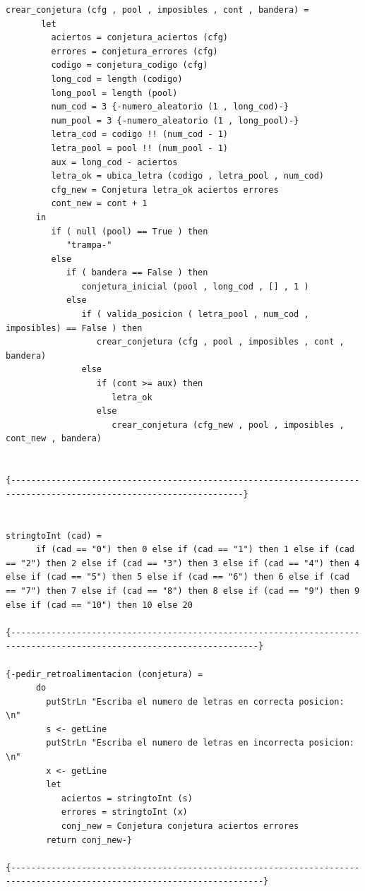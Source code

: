 \begin{itemize}
\begin{verbatim}
crear_conjetura (cfg , pool , imposibles , cont , bandera) = 
       let
         aciertos = conjetura_aciertos (cfg)
         errores = conjetura_errores (cfg)
         codigo = conjetura_codigo (cfg)
         long_cod = length (codigo)
         long_pool = length (pool)
         num_cod = 3 {-numero_aleatorio (1 , long_cod)-}
         num_pool = 3 {-numero_aleatorio (1 , long_pool)-}
         letra_cod = codigo !! (num_cod - 1)
         letra_pool = pool !! (num_pool - 1)
         aux = long_cod - aciertos
         letra_ok = ubica_letra (codigo , letra_pool , num_cod)
         cfg_new = Conjetura letra_ok aciertos errores 
         cont_new = cont + 1
      in
         if ( null (pool) == True ) then
            "trampa-"
         else   
            if ( bandera == False ) then
               conjetura_inicial (pool , long_cod , [] , 1 )
            else
               if ( valida_posicion ( letra_pool , num_cod , imposibles) == False ) then
                  crear_conjetura (cfg , pool , imposibles , cont , bandera)
               else
                  if (cont >= aux) then
                     letra_ok
                  else
                     crear_conjetura (cfg_new , pool , imposibles , cont_new , bandera)
   
               
{--------------------------------------------------------------------------------------------------------------------}


stringtoInt (cad) = 
      if (cad == "0") then 0 else if (cad == "1") then 1 else if (cad == "2") then 2 else if (cad == "3") then 3 else if (cad == "4") then 4 else if (cad == "5") then 5 else if (cad == "6") then 6 else if (cad == "7") then 7 else if (cad == "8") then 8 else if (cad == "9") then 9 else if (cad == "10") then 10 else 20

{-----------------------------------------------------------------------------------------------------------------------}

{-pedir_retroalimentacion (conjetura) = 
      do
        putStrLn "Escriba el numero de letras en correcta posicion: \n"
        s <- getLine
        putStrLn "Escriba el numero de letras en incorrecta posicion: \n"
        x <- getLine
        let
           aciertos = stringtoInt (s)
           errores = stringtoInt (x)
           conj_new = Conjetura conjetura aciertos errores 
        return conj_new-}

{------------------------------------------------------------------------------------------------------------------------}


\end{verbatim}
\end{itemize}
